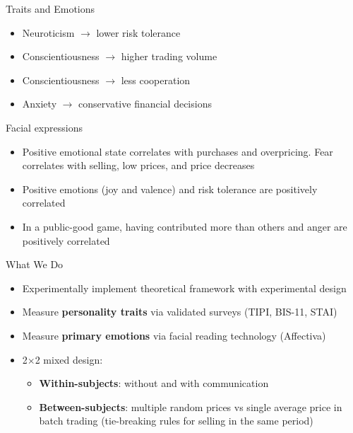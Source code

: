\documentclass{beamer}
\begin{document}
\begin{frame}{Traits and Emotions}
 
\begin{itemize}
    \item Neuroticism $\rightarrow$ lower risk tolerance \citep{rustichini2016toward}
    \item Conscientiousness $\rightarrow$ higher trading volume \citep{bajo2023psychological}
    \item Conscientiousness $\rightarrow$ less cooperation \citep{proto2019intelligence}
    \item Anxiety $\rightarrow$ conservative financial decisions \citep{gambetti2012effect}
\end{itemize}
\end{frame}

\begin{frame}{Facial expressions}
 
\begin{itemize}
    \item Positive emotional state correlates with purchases and overpricing. Fear correlates with selling, low prices, and price decreases \citep{breaban2018emotional}
    
    \item   Positive emotions (joy and valence) and risk tolerance are positively correlated \citep{kassas2022happy}

    \item In a public-good game, having contributed more than others and anger are positively  correlated \citep{noussair2024role}
\end{itemize}
\end{frame}


\begin{frame}{What We Do}
\begin{itemize}
    \item Experimentally implement \cite{bernardo2004liquidity} theoretical framework with \cite{magnani2020dynamic} experimental design
    \item Measure \textbf{personality traits} via validated surveys (TIPI, BIS-11, STAI)
    \item Measure \textbf{primary emotions} via facial reading technology (Affectiva)
    \item 2$\times$2 mixed design:
    \begin{itemize}
        \item \textbf{Within-subjects}: without and with communication
        \item \textbf{Between-subjects}:  multiple random prices vs single average price in batch trading (tie-breaking rules for selling in the same period)
    \end{itemize}
\end{itemize}
\end{frame}
\end{document}

